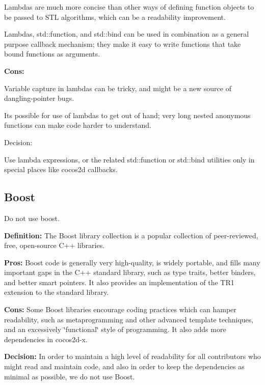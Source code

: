 \begin{DoxyItemize}
\item Lambdas are much more concise than other ways of defining function objects to be passed to S\+TL algorithms, which can be a readability improvement.
\item Lambdas, {\ttfamily std\+::function}, and {\ttfamily std\+::bind} can be used in combination as a general purpose callback mechanism; they make it easy to write functions that take bound functions as arguments.
\end{DoxyItemize}

{\bfseries Cons\+:}


\begin{DoxyItemize}
\item Variable capture in lambdas can be tricky, and might be a new source of dangling-\/pointer bugs.
\item It\textquotesingle{}s possible for use of lambdas to get out of hand; very long nested anonymous functions can make code harder to understand.
\end{DoxyItemize}

Decision\+:

Use lambda expressions, or the related {\ttfamily std\+::function} or {\ttfamily std\+::bind} utilities only in special places like cocos2d callbacks.

\subsection*{Boost}

Do not use boost.

{\bfseries Definition\+:} The Boost library collection is a popular collection of peer-\/reviewed, free, open-\/source C++ libraries.

{\bfseries Pros\+:} Boost code is generally very high-\/quality, is widely portable, and fills many important gaps in the C++ standard library, such as type traits, better binders, and better smart pointers. It also provides an implementation of the T\+R1 extension to the standard library.

{\bfseries Cons\+:} Some Boost libraries encourage coding practices which can hamper readability, such as metaprogramming and other advanced template techniques, and an excessively \char`\"{}functional\char`\"{} style of programming. It also adds more dependencies in cocos2d-\/x.

{\bfseries Decision\+:} In order to maintain a high level of readability for all contributors who might read and maintain code, and also in order to keep the dependencies as minimal as possible, we do not use Boost.

